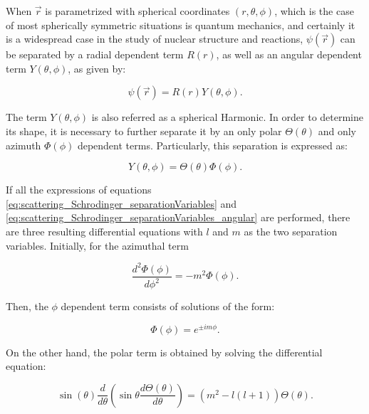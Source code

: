 \documentclass[openany]{book}
\begin{document}
When $\vec r$ is parametrized with spherical coordinates $(r, \theta, \phi)$, which is the case of most spherically symmetric situations is quantum mechanics, and certainly it is a widespread case in the study of nuclear structure and reactions, $\psi(\vec r)$ can be separated by a radial dependent term  $R(r)$, as well as an angular dependent term $Y(\theta, \phi)$, as given by:

\begin{equation}\label{eq:scattering_Schrodinger_separationVariables}
	\psi(\vec r) = R(r) Y(\theta, \phi).
\end{equation}

The term $Y(\theta, \phi)$ is also referred as a spherical Harmonic. In order to determine its shape, it is necessary to further separate it by an only polar $\Theta(\theta)$ and only azimuth $\Phi(\phi)$ dependent terms. Particularly, this separation is expressed as:

\begin{equation}\label{eq:scattering_Schrodinger_separationVariables_angular}
	Y(\theta, \phi) = \Theta (\theta) \Phi (\phi).
\end{equation}

If all the expressions of equations \ref{eq:scattering_Schrodinger_separationVariables} and \ref{eq:scattering_Schrodinger_separationVariables_angular} are performed, there are three resulting differential equations with $l$ and $m$ as the two separation variables. Initially, for the azimuthal term

\begin{equation}\label{eq:scattering_Schrodinger_azimuthal}
	\frac{d^2\Phi(\phi)}{d\phi^2}  = -m^2 \Phi(\phi).
\end{equation}

Then, the $\phi$ dependent term consists of solutions of the form: 

\begin{equation}\label{eq:scattering_Schrodinger_azimuthal_solution}
	\Phi(\phi) = e^{\pm im \phi}.
\end{equation}

On the other hand, the polar term is obtained by solving the differential equation: 

\begin{equation}\label{eq:scattering_Schrodinger_polar}
	\sin(\theta) \frac{d}{d\theta} \left( \sin \theta \frac{d\Theta(\theta)}{d\theta}\right) =  (m^2 - l(l+1) ) \Theta(\theta).
\end{equation}
\end{document}
